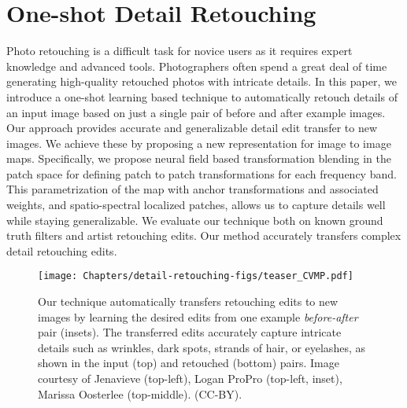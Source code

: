 \chapter{One-shot Detail Retouching}

 Photo retouching is a difficult task for novice users as it requires expert knowledge and advanced tools. Photographers often spend a great deal of time generating high-quality retouched photos with intricate details. In this paper, we introduce a one-shot learning based technique to automatically retouch details of an input image based on just a single pair of before and after example images. Our approach provides accurate and generalizable detail edit transfer to new images. We achieve these by proposing a new representation for image to image maps. Specifically, we propose neural field based transformation blending in the patch space for defining patch to patch transformations for each frequency band. This parametrization of the map with anchor transformations and associated weights, and spatio-spectral localized patches, allows us to capture details well while staying generalizable. We evaluate our technique both on known ground truth filters and artist retouching edits. Our method accurately transfers complex detail retouching edits.



\begin{figure}
  \texttt{[image: Chapters/detail-retouching-figs/teaser\_CVMP.pdf]}
  \caption{Our technique automatically transfers retouching edits to new images by learning the desired edits from one example \textit{before-after} pair (insets). The transferred edits accurately capture intricate details such as wrinkles, dark spots, strands of hair, or eyelashes, as shown in the input (top) and retouched (bottom) pairs. Image courtesy of Jenavieve (top-left), Logan ProPro (top-left, inset), Marissa Oosterlee (top-middle). (CC-BY).}
  \label{fig:teaser}
\end{figure}





